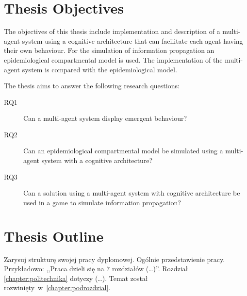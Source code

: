 \section*{Thesis Objectives}

The objectives of this thesis include implementation and description of a multi-agent system using a cognitive architecture that can facilitate each agent having their own behaviour.
For the simulation of information propagation an epidemiological compartmental model is used.
The implementation of the multi-agent system is compared with the epidemiological model.

The thesis aims to answer the following research questions:

\begin{description}
    \item[RQ1] Can a multi-agent system display emergent behaviour?
    \item[RQ2] Can an epidemiological compartmental model be simulated using a multi-agent system with a cognitive architecture?
    \item[RQ3] Can a solution using a multi-agent system with cognitive architecture be used in a game to simulate information propagation?
\end{description}


\section*{Thesis Outline}

Zarysuj strukturę swojej pracy dyplomowej. Ogólnie przedstawienie pracy. Przykładowo: ,,Praca dzieli się na $7$ rozdziałów (\dots)''. Rozdział \ref{chapter:politechnika} dotyczy (\dots). Temat został rozwinięty~w~\ref{chapter:podrozdzial}.